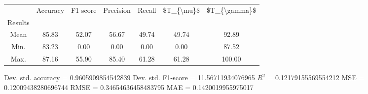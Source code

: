 \begin{tabular}{|c|c|c|c|c|c|c|}
\toprule
{} &  Accuracy &  F1 score &  Precision &  Recall &  \$T\_\{\textbackslash mu\}\$ &  \$T\_\{\textbackslash gamma\}\$ \\
Results &           &           &            &         &            &               \\
\hline
Mean    &     85.83 &     52.07 &      56.67 &   49.74 &      49.74 &         92.89 \\
Min.    &     83.23 &      0.00 &       0.00 &    0.00 &       0.00 &         87.52 \\
Max.    &     87.16 &     55.90 &      85.40 &   61.28 &      61.28 &        100.00 \\
\bottomrule
\end{tabular}

 Dev. std. accuracy = 0.9605909854542839
 Dev. std. F1-score = 11.56711934076965
 $R^2$ = 0.12179155569554212
 MSE = 0.12009438280696744
 RMSE = 0.34654636458483795
 MAE = 0.1420019955975017